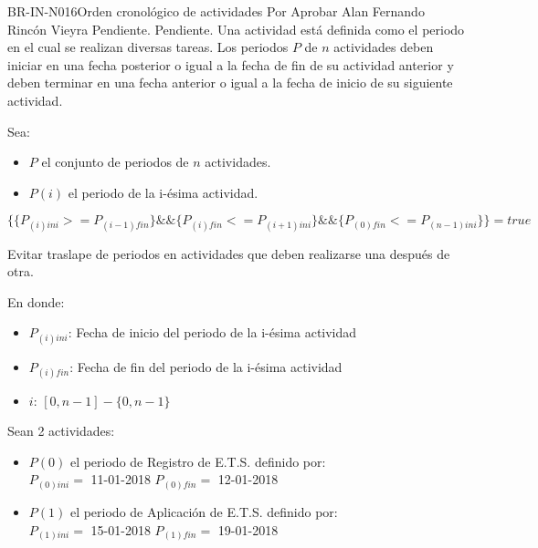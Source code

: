 \begin{BusinessRule}{BR-IN-N016}{Orden cronológico de actividades}
	{\bcAutorization}  %
	{\btEnabler}    %
	{\blControlling}    %
	\BRItem[Estado] Por Aprobar
	 Alan Fernando Rincón Vieyra
	 Pendiente.
	 Pendiente.
	\BRItem[Descripción]  Una actividad está definida como el periodo en el cual se realizan diversas tareas. Los periodos $P$ de $n$ actividades deben iniciar en una fecha posterior o igual a la fecha de fin de su actividad anterior y deben terminar en una fecha anterior o igual a la fecha de inicio de su siguiente actividad.
	
	\BRItem[Sentencia] Sea:
	\begin{itemize}
		\item $P$ el conjunto de periodos de $n$ actividades.
		\item $P(i)$ el periodo de la i-ésima actividad.
	\end{itemize}
	
	\begin{center}
		$ \{ \{P_{(i)ini} >= P_{(i-1)fin} \} \&\& \{P_{(i)fin} <= P_{(i+1)ini}\} \&\& \{P_{(0)fin} <= P_{(n-1)ini}\}
		\} = true$ 
	\end{center}
	
	\BRItem[Motivación] Evitar traslape de periodos en actividades que deben realizarse una después de otra.
	
	En donde:
	\begin{itemize}
		\item $P_{(i)ini}$: Fecha de inicio del periodo de la i-ésima actividad
		\item $P_{(i)fin}$: Fecha de fin del periodo de la i-ésima actividad
		\item $i$: $ [0, n-1] - \{0, n-1\}$
	\end{itemize} 
	
	Sean 2 actividades:
	\begin{itemize}
		\item $P(0)$ el periodo de Registro de E.T.S. definido por: \\
		$P_{(0)ini}=$ 11-01-2018
		$P_{(0)fin}=$ 12-01-2018 \\
		\item $P(1)$ el periodo de Aplicación de E.T.S. definido por:\\
		$P_{(1)ini}=$ 15-01-2018
		$P_{(1)fin}=$ 19-01-2018 \\
	\end{itemize} 
	

\end{BusinessRule}
